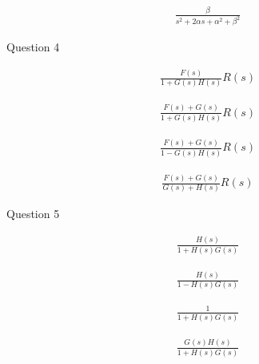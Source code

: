 \documentclass[12pt]{article}
\begin{document}
\begin{align*}
    \frac{\beta}{s^2 + 2\alpha s + \alpha^2 + \beta^2}
\end{align*}

\vspace{1cm}



Question 4 

\vspace{1cm}

\begin{align*}
    \frac{F(s)}{1+G(s)H(s)}R(s)
\end{align*}

\vspace{1cm}

\begin{align*}
    \frac{F(s)+G(s)}{1+G(s)H(s)}R(s)
\end{align*}

\vspace{1cm}

\begin{align*}
    \frac{F(s)+G(s)}{1-G(s)H(s)}R(s)
\end{align*}

\vspace{1cm}

\begin{align*}
    \frac{F(s)+G(s)}{G(s)+H(s)}R(s)
\end{align*}

\vspace{1cm}

Question 5

\vspace{1cm}

\begin{align*}
    \frac{H(s)}{1 + H(s)G(s)}
\end{align*}

\vspace{1cm}

\begin{align*}
    \frac{H(s)}{1 - H(s)G(s)}
\end{align*}

\vspace{1cm}

\begin{align*}
    \frac{1}{1 + H(s)G(s)}
\end{align*}

\vspace{1cm}

\begin{align*}
    \frac{G(s)H(s)}{1 + H(s)G(s)}
\end{align*}
\end{document}

